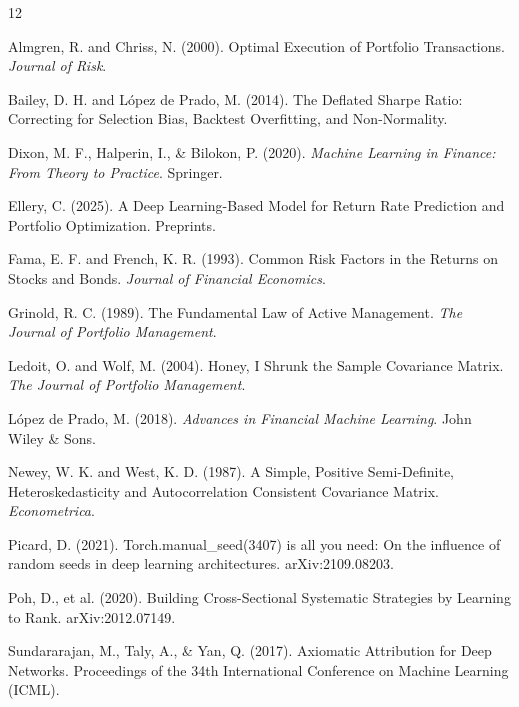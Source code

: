 \documentclass[twoside,final]{hcmut-report}
\begin{document}

\begin{thebibliography}{12}

  Almgren, R. and Chriss, N. (2000).
  Optimal Execution of Portfolio Transactions.
  \emph{Journal of Risk}.

  Bailey, D. H. and López de Prado, M. (2014).
  The Deflated Sharpe Ratio: Correcting for Selection Bias, Backtest Overfitting, and Non-Normality.

  Dixon, M. F., Halperin, I., \& Bilokon, P. (2020).
  \emph{Machine Learning in Finance: From Theory to Practice}.
  Springer.

  Ellery, C. (2025).
  A Deep Learning-Based Model for Return Rate Prediction and Portfolio Optimization.
  Preprints.

  Fama, E. F. and French, K. R. (1993).
  Common Risk Factors in the Returns on Stocks and Bonds.
  \emph{Journal of Financial Economics}.

  Grinold, R. C. (1989).
  The Fundamental Law of Active Management.
  \emph{The Journal of Portfolio Management}.

  Ledoit, O. and Wolf, M. (2004).
  Honey, I Shrunk the Sample Covariance Matrix.
  \emph{The Journal of Portfolio Management}.

  López de Prado, M. (2018).
  \emph{Advances in Financial Machine Learning}.
  John Wiley \& Sons.

  Newey, W. K. and West, K. D. (1987).
  A Simple, Positive Semi-Definite, Heteroskedasticity and Autocorrelation Consistent Covariance Matrix.
  \emph{Econometrica}.

  Picard, D. (2021).
  Torch.manual\_seed(3407) is all you need: On the influence of random seeds in deep learning architectures.
  arXiv:2109.08203.

  Poh, D., et al. (2020).
  Building Cross-Sectional Systematic Strategies by Learning to Rank.
  arXiv:2012.07149.

  Sundararajan, M., Taly, A., \& Yan, Q. (2017).
  Axiomatic Attribution for Deep Networks.
  Proceedings of the 34th International Conference on Machine Learning (ICML).

\end{thebibliography}
\end{document}
